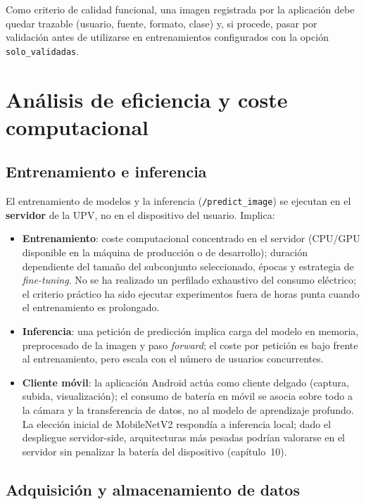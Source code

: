 \documentclass[11pt,spanish,listoffigures,listoftables]{tfgetsinf}
\begin{document}
Como criterio de calidad funcional, una imagen registrada por la aplicación debe quedar trazable (usuario, fuente, formato, clase) y, si procede, pasar por validación antes de utilizarse en entrenamientos configurados con la opción \texttt{solo\_validadas}.

\section{Análisis de eficiencia y coste computacional}

\subsection{Entrenamiento e inferencia}

El entrenamiento de modelos y la inferencia (\texttt{/predict\_image}) se ejecutan en el \textbf{servidor} de la UPV, no en el dispositivo del usuario. Implica:

\begin{itemize}
    \item \textbf{Entrenamiento}: coste computacional concentrado en el servidor (CPU/GPU disponible en la máquina de producción o de desarrollo); duración dependiente del tamaño del subconjunto seleccionado, épocas y estrategia de \textit{fine-tuning}. No se ha realizado un perfilado exhaustivo del consumo eléctrico; el criterio práctico ha sido ejecutar experimentos fuera de horas punta cuando el entrenamiento es prolongado.
    \item \textbf{Inferencia}: una petición de predicción implica carga del modelo en memoria, preprocesado de la imagen y paso \textit{forward}; el coste por petición es bajo frente al entrenamiento, pero escala con el número de usuarios concurrentes.
    \item \textbf{Cliente móvil}: la aplicación Android actúa como cliente delgado (captura, subida, visualización); el consumo de batería en móvil se asocia sobre todo a la cámara y la transferencia de datos, no al modelo de aprendizaje profundo. La elección inicial de MobileNetV2 respondía a inferencia local; dado el despliegue servidor-side, arquitecturas más pesadas podrían valorarse en el servidor sin penalizar la batería del dispositivo (capítulo~10).
\end{itemize}

\subsection{Adquisición y almacenamiento de datos}
\end{document}

